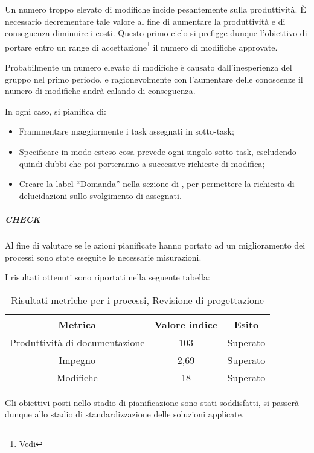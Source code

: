 Un numero troppo elevato di modifiche incide pesantemente sulla produttività. È necessario decrementare tale valore al fine di aumentare la produttività e di conseguenza diminuire i costi. Questo primo ciclo  si prefigge dunque l'obiettivo di portare entro un range di accettazione\footnote{Vedi \PianoDiQualifica} il numero di modifiche approvate.

Probabilmente un numero elevato di modifiche è causato dall'inesperienza del gruppo nel primo periodo, e ragionevolmente con l'aumentare delle conoscenze il numero di modifiche andrà calando di conseguenza. 

In ogni caso, si pianifica di:
\begin{itemize}
\item Frammentare maggiormente i task assegnati in sotto-task;
\item Specificare in modo esteso cosa prevede ogni singolo sotto-task, escludendo quindi dubbi che poi porteranno a successive richieste di modifica;
\item Creare la label ``Domanda'' nella sezione  di , per permettere la richiesta di delucidazioni sullo svolgimento di  assegnati.
\end{itemize}
  
\subparagraph{CHECK}

Al fine di valutare se le azioni pianificate hanno portato ad un miglioramento dei processi sono state eseguite le necessarie misurazioni.

I risultati ottenuti sono riportati nella seguente tabella:
\begin{table}[H]
\centering
\begin{tabular}{ | c | c | c | }
\hline
\textbf{Metrica} & \textbf{Valore indice} & \textbf{Esito} \\
\hline
Produttività di documentazione & 103 & Superato \\
\hline
Impegno & 2,69 & Superato \\
\hline
Modifiche & 18 & Superato \\
\hline
\end{tabular}
\caption{Risultati metriche per i processi, Revisione di progettazione}
\end{table}

Gli obiettivi posti nello stadio di pianificazione sono stati soddisfatti, si passerà dunque allo stadio di standardizzazione delle soluzioni applicate. 



